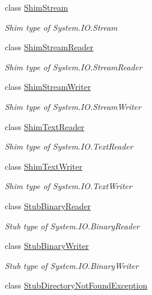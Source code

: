 \begin{DoxyCompactItemize}
class \hyperlink{class_system_1_1_i_o_1_1_fakes_1_1_shim_stream}{Shim\-Stream}
\begin{DoxyCompactList}\small\item\em Shim type of System.\-I\-O.\-Stream\end{DoxyCompactList}\item 
class \hyperlink{class_system_1_1_i_o_1_1_fakes_1_1_shim_stream_reader}{Shim\-Stream\-Reader}
\begin{DoxyCompactList}\small\item\em Shim type of System.\-I\-O.\-Stream\-Reader\end{DoxyCompactList}\item 
class \hyperlink{class_system_1_1_i_o_1_1_fakes_1_1_shim_stream_writer}{Shim\-Stream\-Writer}
\begin{DoxyCompactList}\small\item\em Shim type of System.\-I\-O.\-Stream\-Writer\end{DoxyCompactList}\item 
class \hyperlink{class_system_1_1_i_o_1_1_fakes_1_1_shim_text_reader}{Shim\-Text\-Reader}
\begin{DoxyCompactList}\small\item\em Shim type of System.\-I\-O.\-Text\-Reader\end{DoxyCompactList}\item 
class \hyperlink{class_system_1_1_i_o_1_1_fakes_1_1_shim_text_writer}{Shim\-Text\-Writer}
\begin{DoxyCompactList}\small\item\em Shim type of System.\-I\-O.\-Text\-Writer\end{DoxyCompactList}\item 
class \hyperlink{class_system_1_1_i_o_1_1_fakes_1_1_stub_binary_reader}{Stub\-Binary\-Reader}
\begin{DoxyCompactList}\small\item\em Stub type of System.\-I\-O.\-Binary\-Reader\end{DoxyCompactList}\item 
class \hyperlink{class_system_1_1_i_o_1_1_fakes_1_1_stub_binary_writer}{Stub\-Binary\-Writer}
\begin{DoxyCompactList}\small\item\em Stub type of System.\-I\-O.\-Binary\-Writer\end{DoxyCompactList}\item 
class \hyperlink{class_system_1_1_i_o_1_1_fakes_1_1_stub_directory_not_found_exception}{Stub\-Directory\-Not\-Found\-Exception}

\end{DoxyCompactItemize}
